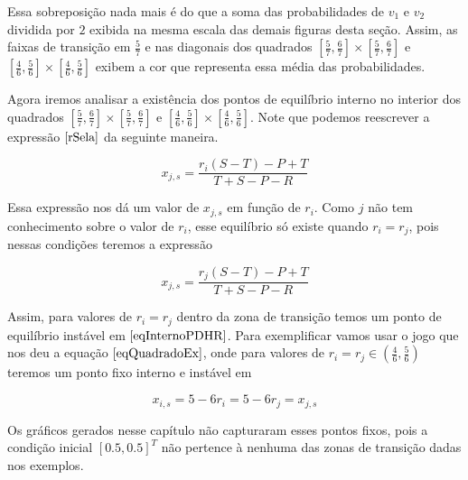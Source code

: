 Essa sobreposição nada mais é do que a soma das probabilidades de $v_1$ e $v_2$ dividida por $2$ exibida na mesma escala das demais figuras desta seção. Assim, as faixas de transição em $\frac{5}{7}$ e nas diagonais dos quadrados $[\frac{5}{7},\frac{6}{7}]\times[\frac{5}{7},\frac{6}{7}]$ e $[\frac{4}{6},\frac{5}{6}]\times[\frac{4}{6},\frac{5}{6}]$ exibem a cor que representa essa média das probabilidades.

Agora iremos analisar a existência dos pontos de equilíbrio interno no interior dos quadrados $[\frac{5}{7},\frac{6}{7}]\times[\frac{5}{7},\frac{6}{7}]$ e $[\frac{4}{6},\frac{5}{6}]\times[\frac{4}{6},\frac{5}{6}]$. Note que podemos reescrever a expressão $\eqref{rSela}$ da seguinte maneira.

\begin{equation}
    x_{j,s}=\frac{r_i(S-T)-P+T}{T+S-P-R}
\end{equation}

Essa expressão nos dá um valor de $x_{j,s}$ em função de $r_i$. Como $j$ não tem conhecimento sobre o valor de $r_i$, esse equilíbrio só existe quando $r_i=r_j$, pois nessas condições teremos a expressão

\begin{equation}
    \label{eqInternoPDHR}
    x_{j,s}=\frac{r_j(S-T)-P+T}{T+S-P-R}
\end{equation}

Assim, para valores de $r_i=r_j$ dentro da zona de transição temos um ponto de equilíbrio instável em $\eqref{eqInternoPDHR}$. Para exemplificar vamos usar o jogo que nos deu a equação $\eqref{eqQuadradoEx}$, onde para valores de $r_i=r_j\in(\frac{4}{6},\frac{5}{6})$ teremos um ponto fixo interno e instável em

\begin{equation}
    x_{i,s}=5-6r_i=5-6r_j=x_{j,s}
\end{equation}

Os gráficos gerados nesse capítulo não capturaram esses pontos fixos, pois a condição inicial $[0.5,0.5]^T$ não pertence à nenhuma das zonas de transição dadas nos exemplos.
